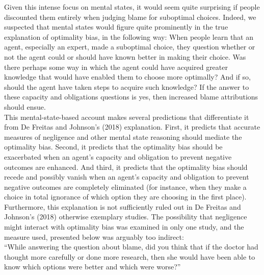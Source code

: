 \documentclass[
  man,floatsintext]{apa6}
\begin{document}
Given this intense focus on mental states, it would seem quite surprising if people discounted them entirely when judging blame for suboptimal choices. Indeed, we suspected that mental states would figure quite prominently in the true explanation of optimality bias, in the following way: When people learn that an agent, especially an expert, made a suboptimal choice, they question whether or not the agent could or should have known better in making their choice. Was there perhaps some way in which the agent could have acquired greater knowledge that would have enabled them to choose more optimally? And if so, should the agent have taken steps to acquire such knowledge? If the answer to these capacity and obligations questions is yes, then increased blame attributions should ensue.\\
This mental-state-based account makes several predictions that differentiate it from De Freitas and Johnson's (2018) explanation. First, it predicts that accurate measures of negligence and other mental state reasoning should mediate the optimality bias. Second, it predicts that the optimality bias should be exacerbated when an agent's capacity and obligation to prevent negative outcomes are enhanced. And third, it predicts that the optimality bias should recede and possibly vanish when an agent's capacity and obligation to prevent negative outcomes are completely eliminated (for instance, when they make a choice in total ignorance of which option they are choosing in the first place).\\
Furthermore, this explanation is not sufficiently ruled out in De Freitas and Johnson's (2018) otherwise exemplary studies. The possibility that negligence might interact with optimality bias was examined in only one study, and the measure used, presented below was arguably too indirect:\\
``While answering the question about blame, did you think that if the doctor had thought more carefully or done more research, then she would have been able to know which options were better and which were worse?''\\
\end{document}
